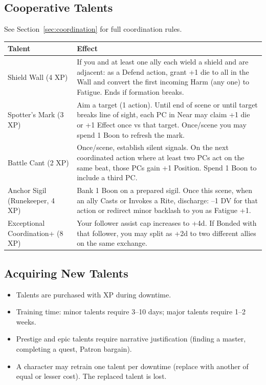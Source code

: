 \subsection{Cooperative Talents}

See Section~\ref{sec:coordination} for full coordination rules.

\begin{tabular}{@{}lp{10cm}@{}}
\toprule
\textbf{Talent} & \textbf{Effect} \\
\midrule
Shield Wall (4 XP) & If you and at least one ally each wield a shield and are adjacent: as a Defend action, grant +1 die to all in the Wall and convert the first incoming Harm (any one) to Fatigue. Ends if formation breaks. \\
Spotter's Mark (3 XP) & Aim a target (1 action). Until end of scene or until target breaks line of sight, each PC in Near may claim +1 die or +1 Effect once vs that target. Once/scene you may spend 1 Boon to refresh the mark. \\
Battle Cant (2 XP) & Once/scene, establish silent signals. On the next coordinated action where at least two PCs act on the same beat, those PCs gain +1 Position. Spend 1 Boon to include a third PC. \\
Anchor Sigil (Runekeeper, 4 XP) & Bank 1 Boon on a prepared sigil. Once this scene, when an ally Casts or Invokes a Rite, discharge: –1 DV for that action or redirect minor backlash to you as Fatigue +1. \\
Exceptional Coordination+ (8 XP) & Your follower assist cap increases to +4d. If Bonded with that follower, you may split as +2d to two different allies on the same exchange. \\
\bottomrule
\end{tabular}

\subsection{Acquiring New Talents}

\begin{itemize}
  \item Talents are purchased with XP during downtime.
  \item Training time: minor talents require 3–10 days; major talents require 1–2 weeks.
  \item Prestige and epic talents require narrative justification (finding a master, completing a quest, Patron bargain).
  \item A character may retrain one talent per downtime (replace with another of equal or lesser cost). The replaced talent is lost.
\end{itemize}
